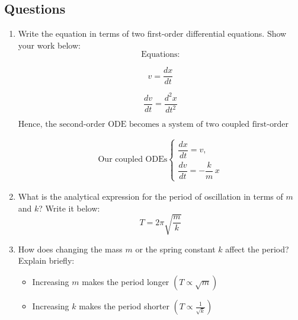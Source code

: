 \documentclass {article}
\begin{document}
\subsection*{Questions}
\begin{enumerate}
    \item Write the equation in terms of two first-order differential equations. Show your work below:
    \[
\text{Equations:}
\]

\begin{equation}
v = \frac{dx}{dt}
\end{equation}

\begin{equation}
\frac{dv}{dt} = \frac{d^2 x}{dt^2}
\end{equation}

\[
\text{Hence, the second-order ODE becomes a system of two coupled first-order ODEs:}
\]

\begin{equation*}
\begin{aligned}
\text{Our coupled ODEs}
\begin{cases}
\dfrac{dx}{dt} = v,\\[6pt]
\dfrac{dv}{dt} = -\dfrac{k}{m}\, x
\end{cases}
\end{aligned}
\end{equation*}

    \item What is the analytical expression for the period of oscillation in terms of $m$ and $k$? Write it below:
    \vspace{1cm}
    \[ T = 2\pi \sqrt{\frac{m}{k}}
 \]
 \vspace{0.5cm}
    \item How does changing the mass $m$ or the spring constant $k$ affect the period? Explain briefly:

    \begin{itemize}
    
    \item Increasing \( m \) makes the period longer \((T \propto \sqrt{m})\)

    \item Increasing \( k \) makes the period shorter \((T \propto \frac{1}{\sqrt{k}})\)
    \end{itemize}
\end{enumerate}
\end{document}
